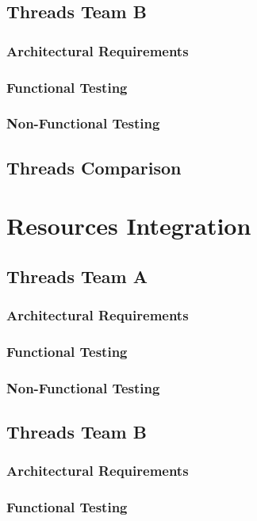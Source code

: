 \documentclass[12pt, oneside]{article}
\begin{document}
	\subsection{Threads Team B}	
		\subsubsection{Architectural Requirements}
		\subsubsection{Functional Testing}
		\subsubsection{Non-Functional Testing }
	
	\subsection{Threads Comparison}

\section{Resources Integration}
	\subsection{Threads Team A}	
		\subsubsection{Architectural Requirements}
		\subsubsection{Functional Testing}
		\subsubsection{Non-Functional Testing }
	
	\subsection{Threads Team B}	
		\subsubsection{Architectural Requirements}
		\subsubsection{Functional Testing}
\end{document}
